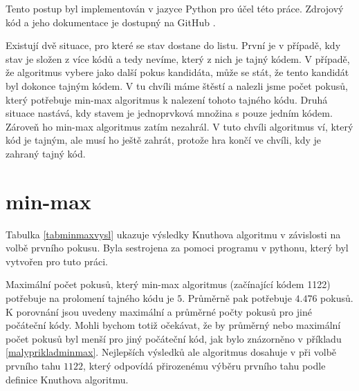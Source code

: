 Tento postup byl implementován v jazyce Python pro účel této práce. Zdrojový kód a jeho dokumentace je dostupný na GitHub \cite{Simsa_Strategies_for_Mastermind_2025}. 




Existují dvě situace, pro které se stav dostane do listu. První je v případě, kdy stav je složen z více kódů a tedy nevíme, který z nich je tajný kódem. V případě, že algoritmus vybere jako další pokus kandidáta, může se stát, že tento kandidát byl dokonce tajným kódem. V tu chvíli máme štěstí a nalezli jsme počet pokusů, který potřebuje min-max algoritmus k nalezení tohoto tajného kódu. Druhá situace nastává, kdy stavem je jednoprvková množina s pouze jedním kódem. Zároveň ho min-max algoritmus zatím nezahrál. V tuto chvíli algoritmus ví, který kód je tajným, ale musí ho ještě zahrát, protože hra končí ve chvíli, kdy je zahraný tajný kód. 

\section{min-max}

Tabulka \ref{tabminmaxvysl} ukazuje výsledky Knuthova algoritmu v závislosti na volbě prvního pokusu. Byla sestrojena za pomoci programu v pythonu, který byl vytvořen pro tuto práci. \cite{Simsa_Strategies_for_Mastermind_2025} 

Maximální počet pokusů, který min-max algoritmus (začínající kódem 1122) potřebuje na prolomení tajného kódu je $5$. Průměrně pak potřebuje $4.476$ pokusů. K porovnání jsou uvedeny maximální a průměrné počty pokusů pro jiné počáteční kódy. Mohli bychom totiž očekávat, že by průměrný nebo maximální počet pokusů byl menší pro jiný počáteční kód, jak bylo znázorněno v příkladu \ref{malyprikladminmax}. Nejlepších výsledků ale algoritmus dosahuje v při volbě prvního tahu $1122$, který odpovídá přirozenému výběru prvního tahu podle definice Knuthova algoritmu. 

